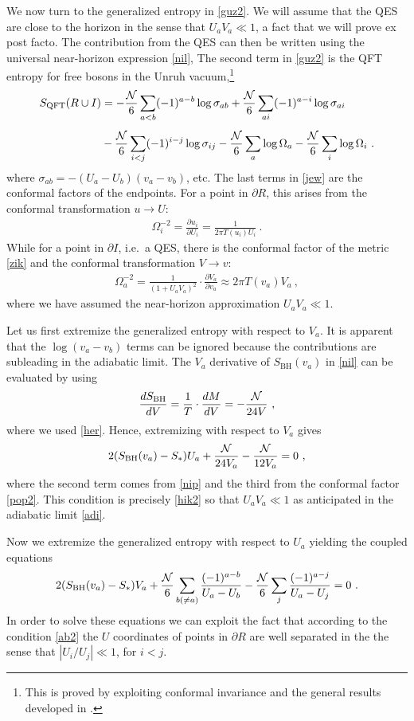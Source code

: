\documentclass[12pt]{article}
\newcommand\SBH{S_\text{BH}}
\newcommand{\EQ}[1]{\begin{equation}\begin{split} #1
\end{split}\end{equation}}
\begin{document}
We now turn to the generalized entropy in \eqref{guz2}. We will assume that the QES are close to the horizon in the sense that $U_aV_a\ll1$, a fact that we will prove ex post facto. The contribution from the QES can then be written using the universal near-horizon expression \eqref{nil},
The second term in \eqref{guz2} is the QFT entropy for free bosons in the Unruh vacuum,\footnote{This is proved  by exploiting  conformal invariance and the general results developed in \cite{Calabrese:2004eu}.}
\EQ{
S_\text{QFT}(R\cup I)&=-\frac{\cal N}6\sum_{a<b}(-1)^{a-b}\log\sigma_{ab}+\frac{\cal N}6\sum_{ai}(-1)^{a-i}\log\sigma_{ai}\\[5pt] &-\frac{\cal N}6\sum_{i<j}(-1)^{i-j}\log\sigma_{ij}-\frac{\cal N}{6}\sum_a\log\Omega_a-\frac{\cal N}6\sum_i\log\Omega_i\ .
\label{jew}
}
where $\sigma_{ab}=-(U_a-U_b)(v_a-v_b)$, etc. The last terms in \eqref{jew} are the conformal factors of the endpoints. For a point in $\partial R$, this arises from the conformal transformation $u\to U$:
\EQ{
\Omega_i^{-2}=\frac{\partial u_i}{\partial U_i}=\frac1{2\pi T(u_i)U_i}\ .
}
While for a point in $\partial I$, i.e.~a QES, there is the conformal factor of the metric \eqref{zik} and the conformal transformation $V\to v$:
\EQ{
\Omega_a^{-2}=\frac1{(1+U_aV_a)^2}\cdot\frac{\partial V_a}{\partial v_a}\approx 2\pi T(v_a)V_a\ ,
\label{pop2}
}
where we have assumed the near-horizon approximation $U_aV_a\ll1$.

Let us first extremize the generalized entropy with respect to $V_a$. It is apparent that the $\log(v_a-v_b)$ terms can be ignored because the contributions are subleading in the adiabatic limit. The $V_a$ derivative of $\SBH (v_a)$ in \eqref{nil} can be evaluated by using
\EQ{
\frac{d\SBH }{dV}=\frac1T\cdot\frac{dM}{dV}=-\frac{\cal N}{24V}\  ,
\label{nip}
}
where we used \eqref{her}. Hence, extremizing with respect to $V_a$ gives
\EQ{
2(\SBH (v_a)-S_*)U_a+\frac{\cal N}{24V_a}-\frac{\cal N}{12V_a}=0\ ,
\label{eq2}
}
where the second term comes from \eqref{nip} and the third from the conformal factor  \eqref{pop2}. This condition is precisely \eqref{hik2} so that $U_aV_a\ll1$ as anticipated in the adiabatic limit \eqref{adi}.

Now we extremize the generalized entropy with respect to $U_a$ yielding the coupled equations
\EQ{
2(\SBH (v_a)-S_*)V_a+\frac{\cal N}6\sum_{b(\neq a)}\frac{(-1)^{a-b}}{U_a-U_b}-
\frac{\cal N}6\sum_{j}\frac{(-1)^{a-j}}{U_a-U_j}=0\ .
\label{eq1}
}
In order to solve these equations we can exploit the fact that according to the condition \eqref{ab2} the $U$ coordinates of points in $\partial R$ are  well separated in the the sense that $|U_i/U_j|\ll 1$, for $i<j$. 
\end{document}
